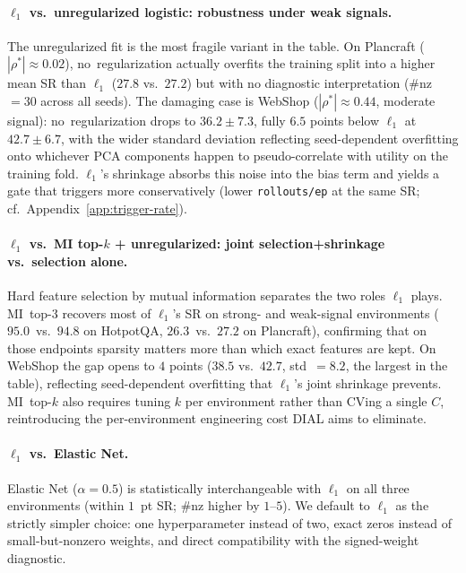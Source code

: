 \paragraph{$\ell_1$ vs.\ unregularized logistic: robustness under
weak signals.}
The unregularized fit is the most fragile variant in the table.
On Plancraft ($|\rho^*|{\approx}0.02$), no~regularization actually
overfits the training split into a higher mean SR than $\ell_1$
($27.8$ vs.\ $27.2$) but with no diagnostic interpretation
($\#$nz~$=30$ across all seeds). The damaging case is WebShop
($|\rho^*|{\approx}0.44$, moderate signal): no~regularization
drops to $36.2\pm7.3$, fully $6.5$ points below $\ell_1$ at
$42.7\pm6.7$, with the wider standard deviation reflecting
seed-dependent overfitting onto whichever PCA components happen
to pseudo-correlate with utility on the training fold.
$\ell_1$'s shrinkage absorbs this noise into the bias term and
yields a gate that triggers more conservatively (lower
\texttt{rollouts/ep} at the same SR; cf.\
Appendix~\ref{app:trigger-rate}).

\paragraph{$\ell_1$ vs.\ MI top-$k$ + unregularized: joint
selection+shrinkage vs.\ selection alone.}
Hard feature selection by mutual information separates the two
roles $\ell_1$ plays. MI~top-3 recovers most of $\ell_1$'s SR
on strong- and weak-signal environments ($95.0$~vs.\ $94.8$ on
HotpotQA, $26.3$~vs.\ $27.2$ on Plancraft), confirming that on
those endpoints sparsity matters more than which exact features
are kept. On WebShop the gap opens to $4$ points ($38.5$ vs.\
$42.7$, std~$=8.2$, the largest in the table), reflecting
seed-dependent overfitting that $\ell_1$'s joint shrinkage
prevents. MI~top-$k$ also requires tuning $k$ per environment
rather than CVing a single $C$, reintroducing the
per-environment engineering cost DIAL aims to eliminate.

\paragraph{$\ell_1$ vs.\ Elastic Net.}
Elastic Net ($\alpha{=}0.5$) is statistically interchangeable
with $\ell_1$ on all three environments (within $1$~pt SR;
$\#$nz higher by $1$--$5$). We default to $\ell_1$ as the
strictly simpler choice: one hyperparameter instead of two,
exact zeros instead of small-but-nonzero weights, and direct
compatibility with the signed-weight diagnostic.

